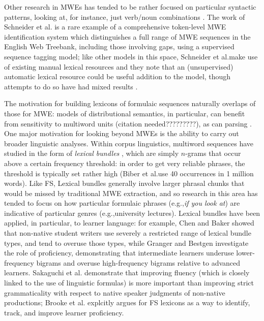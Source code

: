 \documentclass[11pt,letterpaper]{article}
\makeatletter
\def \eg {e.g.,\@ }
\def \al {al.\@ }
\makeatother
\begin{document}
Other research in MWEs has tended to be rather focused on particular syntactic patterns, looking at, for instance, just verb/noun combinations \cite{Fazly09}. The work of Schneider et \al {} is a rare example of a comprehensive token-level MWE identification system which distinguishes a full range of MWE sequences in the English Web Treebank, including those involving gaps, using a supervised sequence tagging model; like other models in this space, Schneider et \al make use of existing manual lexical resources and they note that an (unsupervised) automatic lexical resource could be useful addition to the model, though attempts to do so have had mixed results \cite{Riedl16}. 

The motivation for building lexicons of formulaic sequences naturally overlaps of those for MWE: models of distributional semantics, in particular, can benefit from sensitivity to multiword units (citation needed?????????), as can parsing \cite{Constant16}. One major motivation for looking beyond MWEs is the ability to carry out broader linguistic analyses. Within corpus linguistics, multiword sequences have studied in the form of \textit{lexical bundles} \cite{Biber04}, which are simply $n$-grams that occur above a certain frequency threshold: in order to get very reliable phrases, the threshold is typically set rather high (Biber et \al use 40 occurrences in 1 million words). Like FS, Lexical bundles generally involve larger phrasal chunks that would be missed by traditional MWE extraction, and so research in this area has tended to focus on how particular formulaic phrases (\eg \textit{if you look at}) are indicative of particular genres (\eg university lectures). Lexical bundles have been applied, in particular, to learner language: for example, Chen and Baker  showed that non-native student writers use severely a restricted range of lexical bundle types, and tend to overuse those types, while Granger and Bestgen  investigate the role of proficiency, demonstrating that intermediate learners underuse lower-frequency bigrams and overuse high-frequency bigrams relative to advanced learners. Sakaguchi et \al {} demonstrate that improving fluency (which is closely linked to the use of linguistic formulas) is more important than improving strict grammaticality with respect to native speaker judgments of non-native productions; Brooke et \al {} explcitly argues for FS lexicons as a way to identify, track, and improve learner proficiency.
\end{document}
